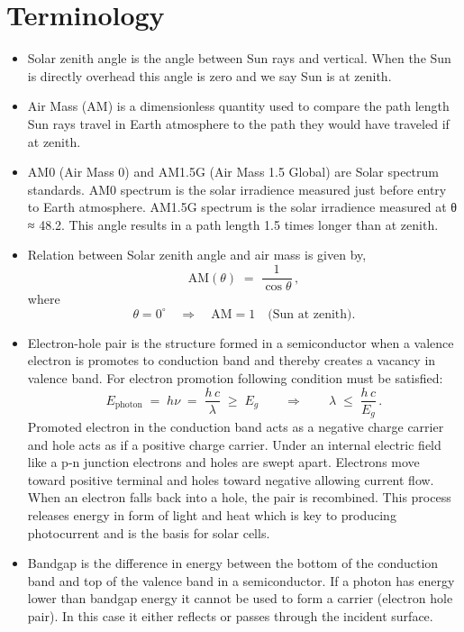 \documentclass[11pt,a4paper]{article}
\begin{document}
\section{Terminology}
\begin{itemize}
  \item Solar zenith angle is the angle between Sun rays and vertical. When the Sun is directly overhead this angle is zero and we say Sun is at zenith.
  \item Air Mass (AM) is a dimensionless quantity used to compare the path length Sun rays travel in Earth atmosphere to the path they would have traveled if at zenith.
  \item AM0 (Air Mass 0) and AM1.5G (Air Mass 1.5 Global) are Solar spectrum standards. AM0 spectrum is the solar irradience measured just before entry to Earth atmosphere. AM1.5G spectrum is the solar irradience measured at θ ≈ 48.2. This angle results in a path length 1.5 times longer than at zenith.
  \item Relation between Solar zenith angle and air mass is given by,
  \begin{equation}
  \mathrm{AM}(\theta) \;=\; \frac{1}{\cos\theta}\,,
  \label{eq:airmass}
\end{equation}
where
\[
  \theta = 0^\circ \quad\Longrightarrow\quad \mathrm{AM}=1
  \quad\text{(Sun at zenith).}
\]
  \item Electron-hole pair is the structure formed in a semiconductor when a valence electron is promotes to conduction band and thereby creates a vacancy in valence band. For electron promotion following condition must be satisfied:  
  \begin{equation}
E_{\mathrm{photon}} \;=\; h\nu \;=\;\frac{h\,c}{\lambda}
\;\ge\;E_{g}
\qquad\Longrightarrow\qquad
\lambda \;\le\;\frac{h\,c}{E_{g}}\,.
\label{eq:ehpair}
\end{equation}
Promoted electron in the conduction band acts as a negative charge carrier and hole acts as if a positive charge carrier. Under an internal electric field like a p-n junction electrons and holes are swept apart. Electrons move toward positive terminal and holes toward negative allowing current flow. When an electron falls back into a hole, the pair is recombined. This process releases energy in form of light and heat which is key to producing photocurrent and is the basis for solar cells.
  \item Bandgap is the difference in energy between the bottom of the conduction band and top of the valence band in a semiconductor. If a photon has energy lower than bandgap energy it cannot be used to form a carrier (electron hole pair). In this case it either reflects or passes through the incident surface.
\end{itemize}
\end{document}
